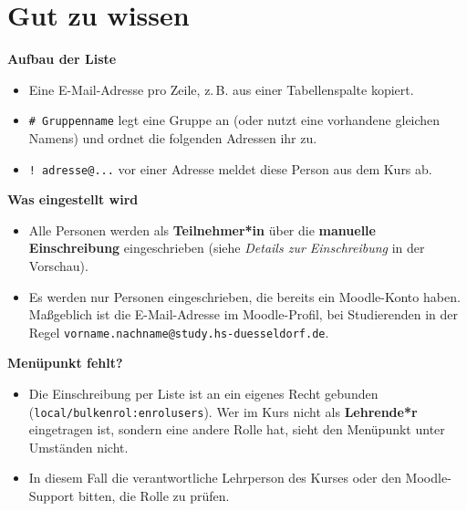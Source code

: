 \documentclass{article}
\begin{document}
\vspace{0.7cm}

\section{Gut zu wissen}

\textbf{Aufbau der Liste}

\begin{itemize}
  \item Eine E-Mail-Adresse pro Zeile, z.\,B. aus einer Tabellenspalte kopiert.
  \item \texttt{\# Gruppenname} legt eine Gruppe an (oder nutzt eine vorhandene gleichen Namens) und ordnet die folgenden Adressen ihr zu.
  \item \texttt{! adresse@...} vor einer Adresse meldet diese Person aus dem Kurs ab.
\end{itemize}

\vspace{0.3cm}

\textbf{Was eingestellt wird}

\begin{itemize}
  \item Alle Personen werden als \textbf{Teilnehmer*in} über die \textbf{manuelle Einschreibung} eingeschrieben (siehe \emph{Details zur Einschreibung} in der Vorschau).
  \item Es werden nur Personen eingeschrieben, die bereits ein Moodle-Konto haben. Maßgeblich ist die E-Mail-Adresse im Moodle-Profil, bei Studierenden in der Regel \texttt{vorname.nachname@study.hs-duesseldorf.de}.
\end{itemize}

\vspace{0.3cm}

\textbf{Menüpunkt fehlt?}

\begin{itemize}
  \item Die Einschreibung per Liste ist an ein eigenes Recht gebunden (\texttt{local/bulkenrol:enrolusers}). Wer im Kurs nicht als \textbf{Lehrende*r} eingetragen ist, sondern eine andere Rolle hat, sieht den Menüpunkt unter Umständen nicht.
  \item In diesem Fall die verantwortliche Lehrperson des Kurses oder den Moodle-Support bitten, die Rolle zu prüfen.
\end{itemize}

\vspace{0.7cm}
\end{document}
